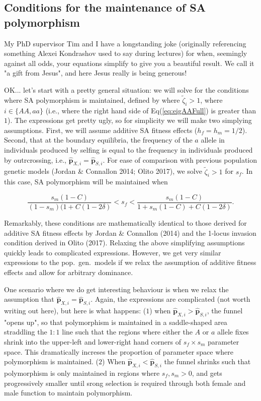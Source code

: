 \documentclass[11pt]{article}
\def\mbf#1{\mathbf{#1}}
\begin{document}
\subsection*{Conditions for the maintenance of SA polymorphism}

My PhD supervisor Tim and I have a longstanding joke (originally referencing something Alexei Kondrashov used to say during lectures) for when, seemingly against all odds, your equations simplify to give you a beautiful result. We call it "a gift from Jesus", and here Jesus really is being generous! 
\bigskip 

OK... let's start with a pretty general situation: we will solve for the conditions where SA polymorphism is maintained, defined by where $\tilde{\zeta}_{i} > 1$, where $i \in \{AA,aa\}$ (i.e., where the right hand side of Eq(\ref{eq:eigAAFull}) is greater than $1$). The expressions get pretty ugly, so for simplicity we will make two simplying assumptions. First, we will assume additive SA fitness effects ($h_f = h_m = 1/2$). Second, that at the boundary equilibria, the frequency of the $a$ allele in individuals produced by selfing is equal to the frequency in individuals produced by outrcrossing, i.e., $\hat{\mbf{p}}_{X,i} = \hat{\mbf{p}}_{S,i}$. For ease of comparison with previous population genetic models (Jordan \& Connallon 2014; Olito 2017), we solve $\tilde{\zeta}_{i} > 1$ for $s_f$. In this case, SA polymorphism will be maintained when

\begin{equation} \label{eq:InvCondSimp}
	\frac{s_m (1 - C)}{(1 - s_m) (1 + C (1 - 2 \delta)} < s_f < \frac{s_m (1 - C)}{1 + s_m (1 - C ) + C (1 - 2 \delta)}.
\end{equation}

\noindent Remarkably, these conditions are mathematically identical to those derived for additive SA fitness effects by Jordan \& Connallon (2014) and the 1-locus invasion condition derived in Olito (2017). Relaxing the above simplifying assumptions quickly leads to complicated expressions. However, we get very similar expressions to the pop.~gen.~models if we relax the assumption of additive fitness effects and allow for arbitrary dominance. 

One scenario where we do get interesting behaviour is when we relax the assumption that $\hat{\mbf{p}}_{X,i} = \hat{\mbf{p}}_{S,i}$. Again, the expressions are complicated (not worth writing out here), but here is what happens: ($1$) when $\hat{\mbf{p}}_{X,i} > \hat{\mbf{p}}_{S,i}$, the funnel "opens up", so that polymorphism is maintained in a saddle-shaped area straddling the $1:1$ line such that the regions where either the $A$ or $a$ allele fixes shrink into the upper-left and lower-right hand corners of $s_f \times s_m$ parameter space. This dramatically increses the proportion of parameter space where polymorphism is maintained. ($2$) When $\hat{\mbf{p}}_{X,i} < \hat{\mbf{p}}_{S,i}$ the funnel shrinks such that polymorphism is only maintained in regions where $s_f,s_m > 0$, and gets progressively smaller until srong selection is required through both female and male function to maintain polymorphism.
\end{document}
